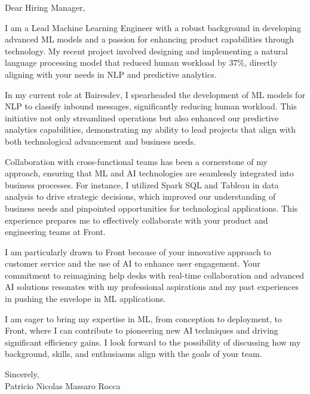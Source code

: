 \documentclass{article}
\begin{document}
\noindent Dear Hiring Manager,


I am a Lead Machine Learning Engineer with a robust background in developing advanced ML models and a passion for enhancing product capabilities through technology. My recent project involved designing and implementing a natural language processing model that reduced human workload by 37\%, directly aligning with your needs in NLP and predictive analytics.


In my current role at Bairesdev, I spearheaded the development of ML models for NLP to classify inbound messages, significantly reducing human workload. This initiative not only streamlined operations but also enhanced our predictive analytics capabilities, demonstrating my ability to lead projects that align with both technological advancement and business needs.


Collaboration with cross-functional teams has been a cornerstone of my approach, ensuring that ML and AI technologies are seamlessly integrated into business processes. For instance, I utilized Spark SQL and Tableau in data analysis to drive strategic decisions, which improved our understanding of business needs and pinpointed opportunities for technological applications. This experience prepares me to effectively collaborate with your product and engineering teams at Front.


I am particularly drawn to Front because of your innovative approach to customer service and the use of AI to enhance user engagement. Your commitment to reimagining help desks with real-time collaboration and advanced AI solutions resonates with my professional aspirations and my past experiences in pushing the envelope in ML applications.


I am eager to bring my expertise in ML, from conception to deployment, to Front, where I can contribute to pioneering new AI techniques and driving significant efficiency gains. I look forward to the possibility of discussing how my background, skills, and enthusiasms align with the goals of your team.

\vspace{1cm}
\setlength{\parskip}{0em}
\begin{flushright}
Sincerely,\\
Patricio Nicolas Massaro Rocca
\end{flushright}
\end{document}
